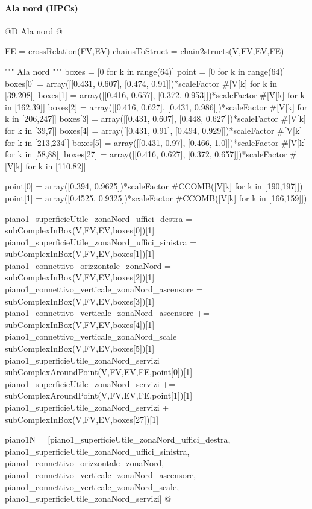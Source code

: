 \documentclass[11pt,oneside]{article}    %
\begin{document}
\paragraph{Ala nord (HPCs)}
@D Ala nord
@{FE = crossRelation(FV,EV)
chainsToStruct = chain2structs(V,FV,EV,FE)

""" Ala nord """
boxes = [0 for k in range(64)]
point = [0 for k in range(64)]
boxes[0] = array([[0.431, 0.607], [0.474, 0.91]])*scaleFactor #[V[k] for k in [39,208]]
boxes[1] = array([[0.416, 0.657], [0.372, 0.953]])*scaleFactor #[V[k] for k in [162,39]]
boxes[2] = array([[0.416, 0.627], [0.431, 0.986]])*scaleFactor #[V[k] for k in [206,247]]
boxes[3] = array([[0.431, 0.607], [0.448, 0.627]])*scaleFactor #[V[k] for k in [39,7]]
boxes[4] = array([[0.431, 0.91], [0.494, 0.929]])*scaleFactor  #[V[k] for k in [213,234]]
boxes[5] = array([[0.431, 0.97], [0.466, 1.0]])*scaleFactor #[V[k] for k in [58,88]]
boxes[27] = array([[0.416, 0.627], [0.372, 0.657]])*scaleFactor #[V[k] for k in [110,82]]

point[0] = array([0.394, 0.9625])*scaleFactor #CCOMB([V[k] for k in [190,197]])
point[1] = array([0.4525, 0.9325])*scaleFactor #CCOMB([V[k] for k in [166,159]])

piano1_superficieUtile_zonaNord_uffici_destra = subComplexInBox(V,FV,EV,boxes[0])[1]
piano1_superficieUtile_zonaNord_uffici_sinistra = subComplexInBox(V,FV,EV,boxes[1])[1]
piano1_connettivo_orizzontale_zonaNord = subComplexInBox(V,FV,EV,boxes[2])[1]
piano1_connettivo_verticale_zonaNord_ascensore = subComplexInBox(V,FV,EV,boxes[3])[1]
piano1_connettivo_verticale_zonaNord_ascensore += subComplexInBox(V,FV,EV,boxes[4])[1]
piano1_connettivo_verticale_zonaNord_scale = subComplexInBox(V,FV,EV,boxes[5])[1]
piano1_superficieUtile_zonaNord_servizi = subComplexAroundPoint(V,FV,EV,FE,point[0])[1]
piano1_superficieUtile_zonaNord_servizi += subComplexAroundPoint(V,FV,EV,FE,point[1])[1]
piano1_superficieUtile_zonaNord_servizi += subComplexInBox(V,FV,EV,boxes[27])[1]

piano1N = [piano1_superficieUtile_zonaNord_uffici_destra, piano1_superficieUtile_zonaNord_uffici_sinistra, piano1_connettivo_orizzontale_zonaNord, piano1_connettivo_verticale_zonaNord_ascensore, piano1_connettivo_verticale_zonaNord_scale, piano1_superficieUtile_zonaNord_servizi]
@}
\end{document}
